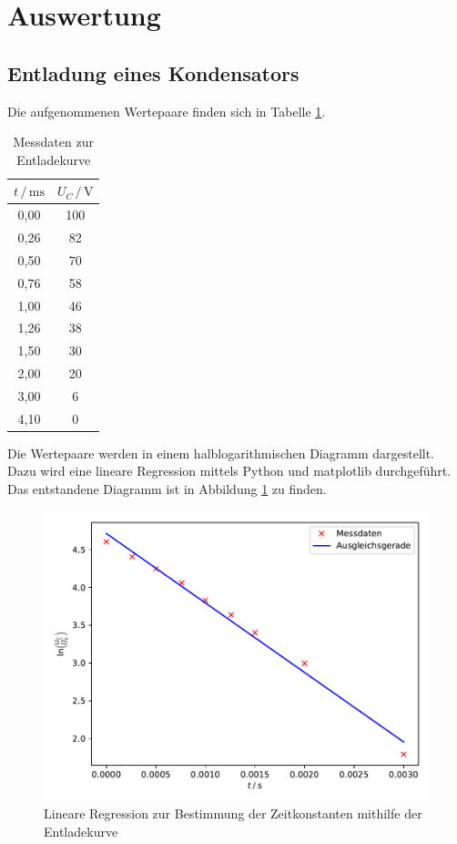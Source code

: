\section{Auswertung}
\label{sec:Auswertung}

\subsection{Entladung eines Kondensators}

Die aufgenommenen Wertepaare finden sich in Tabelle \ref{tab:Messdaten1}.

\begin{table}
\centering
\caption{Messdaten zur Entladekurve}
\label{tab:Messdaten1}
\begin{tabular}{c c}
\toprule
$t \,/\, \si{\milli\second}$ & $U_C \,/\, \si{\volt}$\\
\midrule
0,00 & 100\\
0,26 &  82\\
0,50 &  70\\
0,76 &  58\\
1,00 &  46\\
1,26 &  38\\
1,50 &  30\\
2,00 &  20\\
3,00 &   6\\
4,10 &   0\\
\bottomrule
\end{tabular}
\end{table} 

Die Wertepaare werden in einem halblogarithmischen Diagramm dargestellt. Dazu 
wird eine lineare Regression mittels Python und matplotlib durchgeführt. Das 
entstandene Diagramm ist in Abbildung \ref{fig:plot1} zu finden. 

\begin{figure}
  \centering
  \includegraphics[scale=0.8]{content/plot1.pdf}
  \caption{Lineare Regression zur Bestimmung der Zeitkonstanten mithilfe
  der Entladekurve}
  \label{fig:plot1}
\end{figure}

